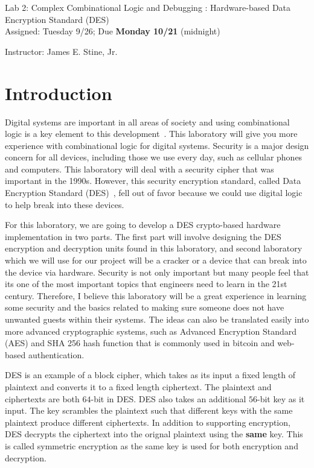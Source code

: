 \documentclass{article}
\newcommand{\myassignment}{Lab 2: Complex Combinational Logic and Debugging : Hardware-based Data Encryption Standard (DES)}
\newcommand{\myduedate}{Assigned: Tuesday 9/26; Due \textbf{Monday 10/21} (midnight)}
\newcommand{\myinstructor}{Instructor: James E. Stine, Jr.}
\begin{document}
\begin{center}
  {\huge \myassignment} \\
  {\large \myduedate} \\
  \begin{flushright}
  \myinstructor \\
  \end{flushright}
\end{center}

\section{Introduction}

Digital systems are important in all areas of society and using
combinational logic is a key element to this
development~\cite{ddca-riscv}.  This
laboratory will give you more experience with combinational logic
for digital systems.  
Security is a major design concern for all devices, including those  we
use every day, such as cellular phones and computers.
This laboratory will deal with a security cipher that was important in
the 1990s.  However, this security encryption standard, called Data
Encryption Standard (DES)~\cite{fips463, Biryukov2005}, fell out of
favor because we
could use
digital logic to help break into these devices.

For this laboratory, we are going to develop a DES crypto-based
hardware implementation
in two parts.  The first part will involve designing the
DES encryption and decryption units found in this laboratory,
and second laboratory which we will
use for our project will be a cracker or a
device that can break into the device via hardware.
Security is not only important but many people feel that its one of the most important
topics that engineers
need to learn in the 21st century.  Therefore, I
believe this laboratory will be a great experience in learning some
security and the basics related to making sure someone does not have
unwanted guests within their systems.  The ideas can also be
translated easily into more advanced cryptographic systems, such as
Advanced Encryption Standard (AES) and SHA 256 hash function that is
commonly used in bitcoin and web-based authentication.

DES is an example of a block cipher, which takes as its input a fixed
length of plaintext and converts it to a fixed length ciphertext.
The plaintext and ciphertexts are both $64$-bit in DES.  DES also
takes an additional $56$-bit key as it input.  The key scrambles the
plaintext such that different keys with the same plaintext produce
different ciphertexts.  In addition to supporting encryption,
DES decrypts the ciphertext into the orignal plaintext using the \textbf{same}
key.  This is called symmetric encryption as the same key is used
for both encryption and decryption.
\end{document}
